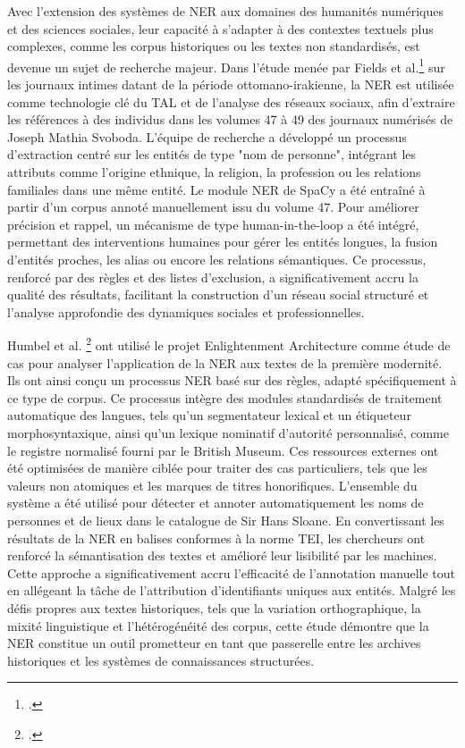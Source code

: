 \documentclass[a4paper,twoside,12pt]{book}
\begin{document}
Avec l'extension des systèmes de NER aux domaines des humanités numériques et des sciences sociales, leur capacité à s'adapter à des contextes textuels plus complexes, comme les corpus historiques ou les textes non standardisés, est devenue un sujet de recherche majeur. Dans l'étude menée par Fields et al.\footcite{fields2023} sur les journaux intimes datant de la période ottomano-irakienne, la NER est utilisée comme technologie clé du TAL et de l'analyse des réseaux sociaux, afin d'extraire les références à des individus dans les volumes 47 à 49 des journaux numérisés de Joseph Mathia Svoboda. L'équipe de recherche a développé un processus d'extraction centré sur les entités de type "nom de personne", intégrant les attributs comme l'origine ethnique, la religion, la profession ou les relations familiales dans une même entité. Le module NER de SpaCy a été entraîné à partir d'un corpus annoté manuellement issu du volume 47. Pour améliorer précision et rappel, un mécanisme de type human-in-the-loop a été intégré, permettant des interventions humaines pour gérer les entités longues, la fusion d'entités proches, les alias ou encore les relations sémantiques. Ce processus, renforcé par des règles et des listes d'exclusion, a significativement accru la qualité des résultats, facilitant la construction d'un réseau social structuré et l'analyse approfondie des dynamiques sociales et professionnelles.

Humbel et al. \footcite{humbel2021} ont utilisé le projet Enlightenment Architecture comme étude de cas pour analyser l'application de la NER aux textes de la première modernité. Ils ont ainsi conçu un processus NER basé sur des règles, adapté spécifiquement à ce type de corpus. Ce processus intègre des modules standardisés de traitement automatique des langues, tels qu'un segmentateur lexical et un étiqueteur morphosyntaxique, ainsi qu'un lexique nominatif d'autorité personnalisé, comme le registre normalisé fourni par le British Museum. Ces ressources externes ont été optimisées de manière ciblée pour traiter des cas particuliers, tels que les valeurs non atomiques et les marques de titres honorifiques. L'ensemble du système a été utilisé pour détecter et annoter automatiquement les noms de personnes et de lieux dans le catalogue de Sir Hans Sloane. En convertissant les résultats de la NER en balises conformes à la norme TEI, les chercheurs ont renforcé la sémantisation des textes et amélioré leur lisibilité par les machines. Cette approche a significativement accru l'efficacité de l'annotation manuelle tout en allégeant la tâche de l'attribution d'identifiants uniques aux entités. Malgré les défis propres aux textes historiques, tels que la variation orthographique, la mixité linguistique et l'hétérogénéité des corpus, cette étude démontre que la NER constitue un outil prometteur en tant que passerelle entre les archives historiques et les systèmes de connaissances structurées.
\end{document}
